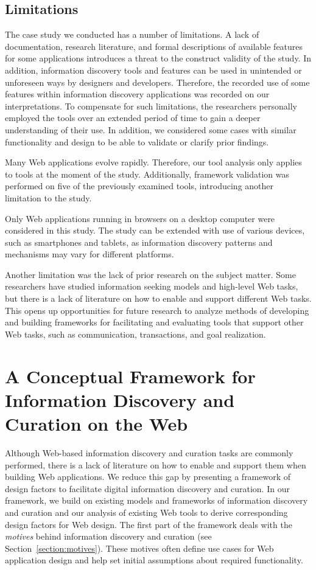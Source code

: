 \documentclass{sigchi}
\begin{document}
{\subsection{Limitations}
The case study we conducted has a number of limitations. A lack of documentation, research literature, and formal descriptions of available features for some applications introduces a threat to the construct validity of the study. In addition, information discovery tools and features can be used in unintended or unforeseen ways by designers and developers. Therefore, the recorded use of some features within information discovery applications was recorded on our interpretations. To compensate for such limitations, the researchers personally employed the tools over an extended period of time to gain a deeper understanding of their use. In addition, we considered some cases with similar functionality and design to be able to validate or clarify prior findings. 

Many Web applications evolve rapidly. Therefore, our tool analysis only applies to tools at the moment of the study. Additionally, framework validation was performed on five of the previously examined tools, introducing another limitation to the study. 

Only Web applications running in browsers on a desktop computer were considered in this study. The study can be extended with use of various devices, such as smartphones and tablets, as information discovery patterns and mechanisms may vary for different platforms. 

Another limitation was the lack of prior research on the subject matter. Some researchers have studied information seeking models and high-level Web tasks, but there is a lack of literature on how to enable and support different Web tasks. This opens up opportunities for future research to analyze methods of developing and building frameworks for facilitating and evaluating tools that support other Web tasks, such as communication, transactions, and goal realization.

\section{A Conceptual Framework for Information Discovery and Curation on the Web}

Although Web-based information discovery and curation tasks are commonly performed, there is a lack of literature on how to enable and support them when building Web applications. We reduce this gap by presenting a framework of design factors to facilitate digital information discovery and curation. In our framework, we build on existing models and frameworks of information discovery and curation and our analysis of existing Web tools to derive corresponding design factors for Web design. The first part of the framework deals with the \textit{motives} behind information discovery and curation (see Section~\ref{section:motives}). These motives often define use cases for Web application design and help set initial assumptions about required functionality.

}
\end{document}
